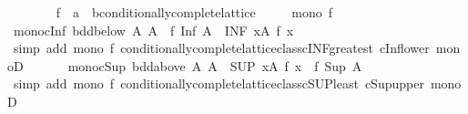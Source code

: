 \begin{isabellebody}
\endisatagproof
{\isafoldproof}%
%
\isadelimproof
\isanewline
%
\endisadelimproof
\isanewline
\ \ \isamarkupfalse%
\isanewline
\ \ \ \ \ f\ {\isacharcolon}{\kern0pt}{\isacharcolon}{\kern0pt}\ {\isachardoublequoteopen}{\isacharprime}{\kern0pt}a\ {\isasymRightarrow}\ {\isacharprime}{\kern0pt}b{\isacharcolon}{\kern0pt}{\isacharcolon}{\kern0pt}conditionally{\isacharunderscore}{\kern0pt}complete{\isacharunderscore}{\kern0pt}lattice{\isachardoublequoteclose}\isanewline
\ \ \ \ \ {\isachardoublequoteopen}mono\ f{\isachardoublequoteclose}\isanewline
\ \ \isanewline
\ \ \isanewline
\ \ \isamarkupfalse%
\ mono{\isacharunderscore}{\kern0pt}cInf{\isacharcolon}{\kern0pt}\ {\isachardoublequoteopen}{\isasymlbrakk}bdd{\isacharunderscore}{\kern0pt}below\ A{\isacharsemicolon}{\kern0pt}\ A{\isasymnoteq}{\isacharbraceleft}{\kern0pt}{\isacharbraceright}{\kern0pt}{\isasymrbrakk}\ {\isasymLongrightarrow}\ f\ {\isacharparenleft}{\kern0pt}Inf\ A{\isacharparenright}{\kern0pt}\ {\isasymle}\ {\isacharparenleft}{\kern0pt}INF\ x{\isasymin}A{\isachardot}{\kern0pt}\ f\ x{\isacharparenright}{\kern0pt}{\isachardoublequoteclose}\isanewline
%
\isadelimproof
\ \ \ \ %
\endisadelimproof
%
\isatagproof
{}\isamarkupfalse%
\ {\isacharparenleft}{\kern0pt}simp\ add{\isacharcolon}{\kern0pt}\ {\isacartoucheopen}mono\ f{\isacartoucheclose}\ conditionally{\isacharunderscore}{\kern0pt}complete{\isacharunderscore}{\kern0pt}lattice{\isacharunderscore}{\kern0pt}class{\isachardot}{\kern0pt}cINF{\isacharunderscore}{\kern0pt}greatest\ cInf{\isacharunderscore}{\kern0pt}lower\ monoD{\isacharparenright}{\kern0pt}%
\endisatagproof
{\isafoldproof}%
%
\isadelimproof
\isanewline
%
\endisadelimproof
\ \ \isanewline
\ \ \isamarkupfalse%
\ mono{\isacharunderscore}{\kern0pt}cSup{\isacharcolon}{\kern0pt}\ {\isachardoublequoteopen}{\isasymlbrakk}bdd{\isacharunderscore}{\kern0pt}above\ A{\isacharsemicolon}{\kern0pt}\ A{\isasymnoteq}{\isacharbraceleft}{\kern0pt}{\isacharbraceright}{\kern0pt}{\isasymrbrakk}\ {\isasymLongrightarrow}\ {\isacharparenleft}{\kern0pt}SUP\ x{\isasymin}A{\isachardot}{\kern0pt}\ f\ x{\isacharparenright}{\kern0pt}\ {\isasymle}\ f\ {\isacharparenleft}{\kern0pt}Sup\ A{\isacharparenright}{\kern0pt}{\isachardoublequoteclose}\isanewline
%
\isadelimproof
\ \ \ \ %
\endisadelimproof
%
\isatagproof
{}\isamarkupfalse%
\ {\isacharparenleft}{\kern0pt}simp\ add{\isacharcolon}{\kern0pt}\ {\isacartoucheopen}mono\ f{\isacartoucheclose}\ conditionally{\isacharunderscore}{\kern0pt}complete{\isacharunderscore}{\kern0pt}lattice{\isacharunderscore}{\kern0pt}class{\isachardot}{\kern0pt}cSUP{\isacharunderscore}{\kern0pt}least\ cSup{\isacharunderscore}{\kern0pt}upper\ monoD{\isacharparenright}{\kern0pt}%

\end{isabellebody}

